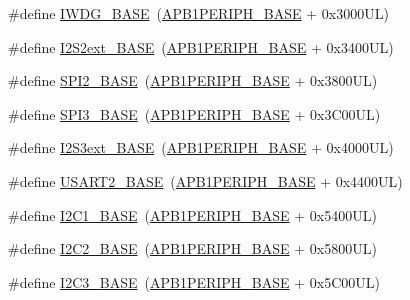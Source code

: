 \begin{DoxyCompactItemize}
\item 
\#define \hyperlink{group___peripheral__memory__map_ga8543ee4997296af5536b007cd4748f55}{I\+W\+D\+G\+\_\+\+B\+A\+SE}~(\hyperlink{group___peripheral__memory__map_ga45666d911f39addd4c8c0a0ac3388cfb}{A\+P\+B1\+P\+E\+R\+I\+P\+H\+\_\+\+B\+A\+SE} + 0x3000\+U\+L)
\item 
\#define \hyperlink{group___peripheral__memory__map_gaa5f7b241ed5b756decd835300c9e7bc9}{I2\+S2ext\+\_\+\+B\+A\+SE}~(\hyperlink{group___peripheral__memory__map_ga45666d911f39addd4c8c0a0ac3388cfb}{A\+P\+B1\+P\+E\+R\+I\+P\+H\+\_\+\+B\+A\+SE} + 0x3400\+U\+L)
\item 
\#define \hyperlink{group___peripheral__memory__map_gac3e357b4c25106ed375fb1affab6bb86}{S\+P\+I2\+\_\+\+B\+A\+SE}~(\hyperlink{group___peripheral__memory__map_ga45666d911f39addd4c8c0a0ac3388cfb}{A\+P\+B1\+P\+E\+R\+I\+P\+H\+\_\+\+B\+A\+SE} + 0x3800\+U\+L)
\item 
\#define \hyperlink{group___peripheral__memory__map_gae634fe8faa6922690e90fbec2fc86162}{S\+P\+I3\+\_\+\+B\+A\+SE}~(\hyperlink{group___peripheral__memory__map_ga45666d911f39addd4c8c0a0ac3388cfb}{A\+P\+B1\+P\+E\+R\+I\+P\+H\+\_\+\+B\+A\+SE} + 0x3\+C00\+U\+L)
\item 
\#define \hyperlink{group___peripheral__memory__map_ga89b61d6e6b09e94f3fccb7bef34e0263}{I2\+S3ext\+\_\+\+B\+A\+SE}~(\hyperlink{group___peripheral__memory__map_ga45666d911f39addd4c8c0a0ac3388cfb}{A\+P\+B1\+P\+E\+R\+I\+P\+H\+\_\+\+B\+A\+SE} + 0x4000\+U\+L)
\item 
\#define \hyperlink{group___peripheral__memory__map_gade83162a04bca0b15b39018a8e8ec090}{U\+S\+A\+R\+T2\+\_\+\+B\+A\+SE}~(\hyperlink{group___peripheral__memory__map_ga45666d911f39addd4c8c0a0ac3388cfb}{A\+P\+B1\+P\+E\+R\+I\+P\+H\+\_\+\+B\+A\+SE} + 0x4400\+U\+L)
\item 
\#define \hyperlink{group___peripheral__memory__map_gacd72dbffb1738ca87c838545c4eb85a3}{I2\+C1\+\_\+\+B\+A\+SE}~(\hyperlink{group___peripheral__memory__map_ga45666d911f39addd4c8c0a0ac3388cfb}{A\+P\+B1\+P\+E\+R\+I\+P\+H\+\_\+\+B\+A\+SE} + 0x5400\+U\+L)
\item 
\#define \hyperlink{group___peripheral__memory__map_ga04bda70f25c795fb79f163b633ad4a5d}{I2\+C2\+\_\+\+B\+A\+SE}~(\hyperlink{group___peripheral__memory__map_ga45666d911f39addd4c8c0a0ac3388cfb}{A\+P\+B1\+P\+E\+R\+I\+P\+H\+\_\+\+B\+A\+SE} + 0x5800\+U\+L)
\item 
\#define \hyperlink{group___peripheral__memory__map_ga4e8b9198748235a1729e1e8f8f24983b}{I2\+C3\+\_\+\+B\+A\+SE}~(\hyperlink{group___peripheral__memory__map_ga45666d911f39addd4c8c0a0ac3388cfb}{A\+P\+B1\+P\+E\+R\+I\+P\+H\+\_\+\+B\+A\+SE} + 0x5\+C00\+U\+L)

\end{DoxyCompactItemize}
